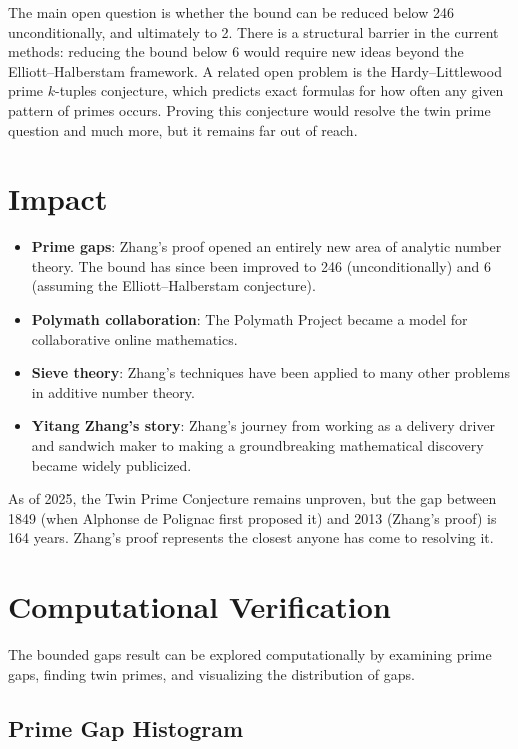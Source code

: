The main open question is whether the bound can be reduced below 246 unconditionally, and ultimately to 2. There is a structural barrier in the current methods: reducing the bound below 6 would require new ideas beyond the Elliott--Halberstam framework. A related open problem is the Hardy--Littlewood prime $k$-tuples conjecture, which predicts exact formulas for how often any given pattern of primes occurs. Proving this conjecture would resolve the twin prime question and much more, but it remains far out of reach.

\section{Impact}

\begin{itemize}
\item \textbf{Prime gaps}: Zhang's proof opened an entirely new area of analytic number theory. The bound has since been improved to 246 (unconditionally) and 6 (assuming the Elliott--Halberstam conjecture).
\item \textbf{Polymath collaboration}: The Polymath Project became a model for collaborative online mathematics.
\item \textbf{Sieve theory}: Zhang's techniques have been applied to many other problems in additive number theory.
\item \textbf{Yitang Zhang's story}: Zhang's journey from working as a delivery driver and sandwich maker to making a groundbreaking mathematical discovery became widely publicized.
\end{itemize}

\begin{highlightbox}
As of 2025, the Twin Prime Conjecture remains unproven, but the gap between 1849 (when Alphonse de Polignac first proposed it) and 2013 (Zhang's proof) is 164 years. Zhang's proof represents the closest anyone has come to resolving it.
\end{highlightbox}

\section{Computational Verification}

The bounded gaps result can be explored computationally by examining prime gaps, finding twin primes, and visualizing the distribution of gaps.

\subsection{Prime Gap Histogram}

